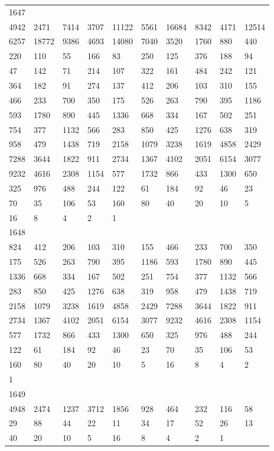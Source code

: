 \begin{longtable}{*{10}{l}}
1647&&&&&&&&&\\
4942& 2471& 7414& 3707& 11122& 5561& 16684& 8342& 4171& 12514\\
6257& 18772& 9386& 4693& 14080& 7040& 3520& 1760& 880& 440\\
220& 110& 55& 166& 83& 250& 125& 376& 188& 94\\
47& 142& 71& 214& 107& 322& 161& 484& 242& 121\\
364& 182& 91& 274& 137& 412& 206& 103& 310& 155\\
466& 233& 700& 350& 175& 526& 263& 790& 395& 1186\\
593& 1780& 890& 445& 1336& 668& 334& 167& 502& 251\\
754& 377& 1132& 566& 283& 850& 425& 1276& 638& 319\\
958& 479& 1438& 719& 2158& 1079& 3238& 1619& 4858& 2429\\
7288& 3644& 1822& 911& 2734& 1367& 4102& 2051& 6154& 3077\\
9232& 4616& 2308& 1154& 577& 1732& 866& 433& 1300& 650\\
325& 976& 488& 244& 122& 61& 184& 92& 46& 23\\
70& 35& 106& 53& 160& 80& 40& 20& 10& 5\\
16& 8& 4& 2& 1& \\

1648&&&&&&&&&\\
824& 412& 206& 103& 310& 155& 466& 233& 700& 350\\
175& 526& 263& 790& 395& 1186& 593& 1780& 890& 445\\
1336& 668& 334& 167& 502& 251& 754& 377& 1132& 566\\
283& 850& 425& 1276& 638& 319& 958& 479& 1438& 719\\
2158& 1079& 3238& 1619& 4858& 2429& 7288& 3644& 1822& 911\\
2734& 1367& 4102& 2051& 6154& 3077& 9232& 4616& 2308& 1154\\
577& 1732& 866& 433& 1300& 650& 325& 976& 488& 244\\
122& 61& 184& 92& 46& 23& 70& 35& 106& 53\\
160& 80& 40& 20& 10& 5& 16& 8& 4& 2\\
1& \\

1649&&&&&&&&&\\
4948& 2474& 1237& 3712& 1856& 928& 464& 232& 116& 58\\
29& 88& 44& 22& 11& 34& 17& 52& 26& 13\\
40& 20& 10& 5& 16& 8& 4& 2& 1& \\


\end{longtable}
